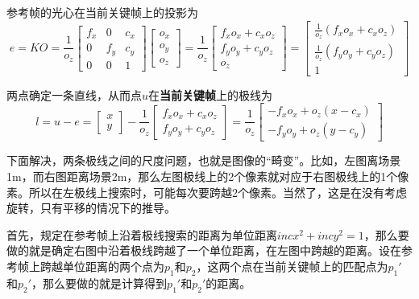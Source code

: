 参考帧的光心在当前关键帧上的投影为
\begin{equation}
	e = KO = 
		\frac{1}{o_z}\left[ 
			\begin{array}{ccc}
			f_x & 0 & c_x \\
			0 & f_y & c_y \\
			0 & 0 & 1
			\end{array}
		\right] 
		\left[ 
			\begin{array}{c}
				o_x \\
				o_y \\
				o_z 
			\end{array}
		\right]
		=
		\frac{1}{o_z} 
		\left[
			\begin{array}{c}
				f_x o_x + c_x o_z \\
				f_y o_y + c_y o_z \\
				o_z
			\end{array}
		\right]
		=
		\left[
			\begin{array}{c}
				\frac{1}{o_z}(f_x o_x + c_x o_z) \\
				\frac{1}{o_z}(f_y o_y + c_y o_z) \\
				1
			\end{array}
		\right]		
\end{equation}

两点确定一条直线，从而点$u$在\textbf{当前关键帧}上的极线为
\begin{equation}
	l = u - e = 
	\left[
		\begin{array}{c}
			x \\
			y
		\end{array}
	\right]
	- 
	\frac{1}{o_z}
	\left[
		\begin{array}{c}
			f_x o_x + c_x o_z  \\
			f_y o_y + c_y o_z
		\end{array}
	\right]
	= 
	\frac{1}{o_z}
	\left[
		\begin{array}{c}
			-f_x o_x + o_z (x - c_x) \\
			-f_y o_y + o_z (y - c_y)
		\end{array}
	\right]
\end{equation}




下面解决，两条极线之间的尺度问题，也就是图像的“畸变”。比如，左图离场景1m，而右图距离场景2m，那么左图极线上的2个像素就对应于右图极线上的1个像素。所以在左极线上搜索时，可能每次要跨越2个像素。当然了，这是在没有考虑旋转，只有平移的情况下的推导。


首先，规定在参考帧上沿着极线搜索的距离为单位距离$incx^2 + incy^2 = 1$，那么要做的就是确定右图中沿着极线跨越了一个单位距离，在左图中跨越的距离。设在参考帧上跨越单位距离的两个点为$p_1$和$p_2$，这两个点在当前关键帧上的匹配点为$p_1'$和$p_2'$，那么要做的就是计算得到$p_1'$和$p_2'$的距离。

